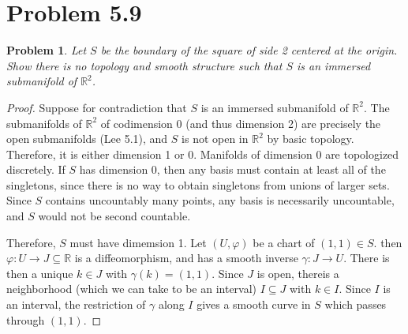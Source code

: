 \documentclass[11pt, letterpaper]{article}
\theoremstyle{plain}
\newtheorem{problem}{Problem}[section]
\begin{document}
\section{Problem 5.9}
\begin{problem}
	Let $S$ be the boundary of the square of side 2 centered at the origin. Show there is no topology and smooth structure such that $S$ is an immersed submanifold of $\mathbb{R} ^2$.
\end{problem}
\begin{proof}
	Suppose for contradiction that $S$ is an immersed submanifold of $\mathbb{R} ^2$. The submanifolds of $\mathbb{R} ^2$ of codimension 0 (and thus dimension 2) are precisely the open submanifolds (Lee 5.1), and $S$ is not open in $\mathbb{R} ^2$ by basic topology. Therefore, it is either dimension 1 or 0. Manifolds of dimension 0 are topologized discretely. If $S$ has dimension 0, then any basis must contain at least all of the singletons, since there is no way to obtain singletons from unions of larger sets. Since $S$ contains uncountably many points, any basis is necessarily uncountable, and $S$ would not be second countable.

	Therefore, $S$ must have dimemsion 1. Let $(U,\varphi )$ be a chart of $(1,1)\in S$. then $\varphi : U \to J\subseteq \mathbb{R} $ is a diffeomorphism, and has a smooth inverse $\gamma : J \to U$. There is then a unique $k\in J$ with $\gamma (k)=(1,1)$. Since $J$ is open, thereis a neighborhood (which we can take to be an interval) $I\subseteq J$ with $k\in I$. Since $I$ is an interval, the restriction of $\gamma $ along $I$ gives a smooth curve in $S$ which passes through $(1,1)$.


\end{proof}
\end{document}
